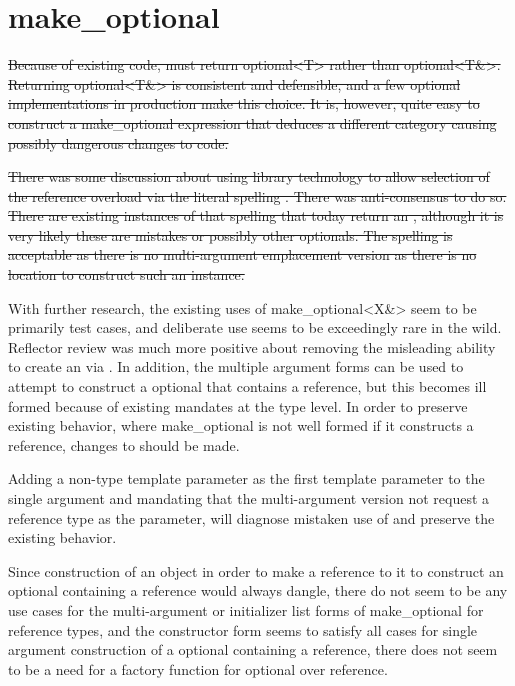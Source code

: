 \documentclass[a4paper,10pt,oneside,openany,final,article]{memoir}
\begin{document}
\section{make_optional}
\begin{removedblock}
\sout{Because of existing code,  must return optional<T> rather than optional<T\&>. Returning optional<T\&> is consistent and defensible, and a few optional implementations in production make this choice. It is, however, quite easy to construct a make_optional expression that deduces a different category causing possibly dangerous changes to code.}

\sout{There was some discussion about using library technology to allow selection of the reference overload via the literal spelling . There was anti-consensus to do so. There are existing instances of that spelling that today return an , although it is very likely these are mistakes or possibly other optionals. The spelling  is acceptable as there is no multi-argument emplacement version as there is no location to construct such an instance.}
\end{removedblock}

\begin{addedblock}
With further research, the existing uses of make_optional<X\&> seem to be primarily test cases, and deliberate use seems to be exceedingly rare in the wild. Reflector review was much more positive about removing the misleading ability to create an  via . In addition, the multiple argument forms can be used to attempt to construct a optional that contains a reference, but this becomes ill formed because of existing mandates at the type level. In order to preserve existing behavior, where make_optional is not well formed if it constructs a reference, changes to  should be made.

Adding a non-type template parameter as the first template parameter to the single argument  and mandating that the multi-argument version not request a reference type as the parameter, will diagnose mistaken use of  and preserve the existing behavior.

Since construction of an object in order to make a reference to it to construct an optional containing a reference would always dangle, there do not seem to be any use cases for the multi-argument or initializer list forms of make_optional for reference types, and the constructor form seems to satisfy all cases for single argument construction of a optional containing a reference, there does not seem to be a need for a factory function for optional over reference.

\end{addedblock}
\end{document}
